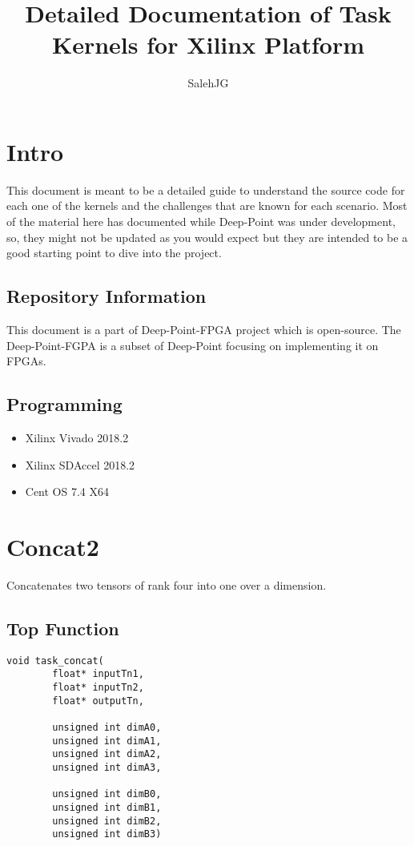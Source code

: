 \documentclass[•]{article}
\title{Detailed Documentation of Task Kernels for Xilinx Platform}
\author{SalehJG}
\begin{document}
\maketitle

\section{Intro}
This document is meant to be a detailed guide to understand the source code for each one of the kernels and the challenges that are known for each scenario.
Most of the material here has documented while Deep-Point was under development, so, they might not be updated as you would expect but they are intended to be a good starting point to dive into the project.

\subsection{Repository Information}
This document is a part of Deep-Point-FPGA project which is open-source. The Deep-Point-FGPA is a subset of Deep-Point focusing on implementing it on FPGAs.

\subsection{Programming}
\begin{itemize}
\item Xilinx Vivado 2018.2
\item Xilinx SDAccel 2018.2
\item Cent OS 7.4 X64
\end{itemize}

\pagebreak

\section{Concat2}
Concatenates two tensors of rank four into one over a dimension.
\subsection{Top Function}
\begin{lstlisting}
void task_concat(
		float* inputTn1,
	    float* inputTn2,
	    float* outputTn,

		unsigned int dimA0,
		unsigned int dimA1,
		unsigned int dimA2,
		unsigned int dimA3,

		unsigned int dimB0,
		unsigned int dimB1,
		unsigned int dimB2,
		unsigned int dimB3)
\end{lstlisting}
\end{document}
